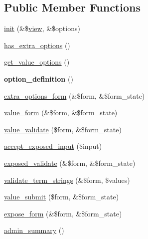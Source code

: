 \subsection*{Public Member Functions}
\begin{DoxyCompactItemize}
\item 
\hyperlink{classviews__handler__filter__term__node__tid_ab4f316cfbf968a2faa8e574b9df5c4f3}{init} (\&\$\hyperlink{classview}{view}, \&\$options)
\item 
\hyperlink{classviews__handler__filter__term__node__tid_a72232eda675756741ce92061cb4685ee}{has\_\-extra\_\-options} ()
\item 
\hyperlink{classviews__handler__filter__term__node__tid_a78e569201a5b833da4aafbf325a77c44}{get\_\-value\_\-options} ()
\item 
\hypertarget{classviews__handler__filter__term__node__tid_ae81fb582295a2c8871b32bbf8b3ea915}{
{\bfseries option\_\-definition} ()}
\label{classviews__handler__filter__term__node__tid_ae81fb582295a2c8871b32bbf8b3ea915}

\item 
\hyperlink{classviews__handler__filter__term__node__tid_adf599d1bef08003b1b734dfd397030a6}{extra\_\-options\_\-form} (\&\$form, \&\$form\_\-state)
\item 
\hyperlink{classviews__handler__filter__term__node__tid_a3259d8a91cb0c13c51c02942b267b131}{value\_\-form} (\&\$form, \&\$form\_\-state)
\item 
\hyperlink{classviews__handler__filter__term__node__tid_a907bf3c6a90070dc9e9bc3e609a96888}{value\_\-validate} (\$form, \&\$form\_\-state)
\item 
\hyperlink{classviews__handler__filter__term__node__tid_a75f38674ff356981f6e77f009da2101a}{accept\_\-exposed\_\-input} (\$input)
\item 
\hyperlink{classviews__handler__filter__term__node__tid_ab0c4583fea802e86c84fabafc4768074}{exposed\_\-validate} (\&\$form, \&\$form\_\-state)
\item 
\hyperlink{classviews__handler__filter__term__node__tid_a762ab62bf1d1431daedea8f5d344bba4}{validate\_\-term\_\-strings} (\&\$form, \$values)
\item 
\hyperlink{classviews__handler__filter__term__node__tid_a48244c2456ac78e1855d9a48632ce045}{value\_\-submit} (\$form, \&\$form\_\-state)
\item 
\hyperlink{classviews__handler__filter__term__node__tid_abf972bb53512f371af5c1ec32048f686}{expose\_\-form} (\&\$form, \&\$form\_\-state)
\item 
\hyperlink{classviews__handler__filter__term__node__tid_a392046588b13b1b76223eb22ba4ff660}{admin\_\-summary} ()
\end{DoxyCompactItemize}
